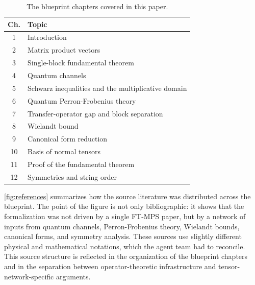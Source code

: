 \begin{table}[h]
    \caption{\label{tab:chapters}The \nChapters{} blueprint chapters covered in this paper.}
    \begin{tabular}{cl}
        \toprule
        {Ch.} & {Topic}                                               \\
        \midrule
        1        & Introduction                                       \\
        2        & Matrix product vectors                             \\
        3        & Single-block fundamental theorem                   \\
        4        & Quantum channels                                   \\
        5        & Schwarz inequalities and the multiplicative domain \\
        6        & Quantum Perron-Frobenius theory                    \\
        7        & Transfer-operator gap and block separation         \\
        8        & Wielandt bound                                     \\
        9        & Canonical form reduction                           \\
        10       & Basis of normal tensors                            \\
        11       & Proof of the fundamental theorem                   \\
        12       & Symmetries and string order                        \\
        \bottomrule
    \end{tabular}
\end{table}



\cref{fig:references} summarizes how the source literature was distributed across the blueprint. The point of the figure is not only bibliographic: it shows that the formalization was not driven by a single FT-MPS paper, but by a network of inputs from quantum channels, Perron-Frobenius theory, Wielandt bounds, canonical forms, and symmetry analysis. These sources use slightly different physical and mathematical notations, which the agent team had to reconcile.
This source structure is reflected in the organization of the blueprint chapters and in the separation between operator-theoretic infrastructure and tensor-network-specific arguments.

